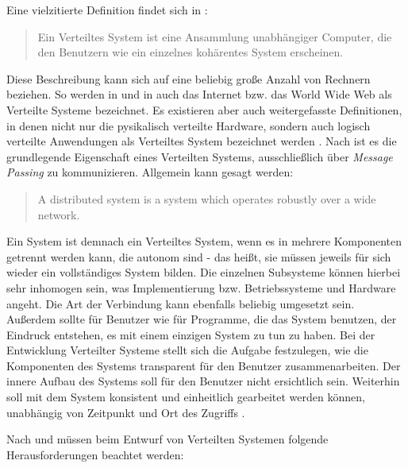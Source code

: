 Eine vielzitierte Definition findet sich in :

\begin{quote}
Ein Verteiltes System ist eine Ansammlung unabhängiger Computer, die den Benutzern wie ein einzelnes kohärentes System erscheinen. 
\end{quote}

Diese Beschreibung kann sich auf eine beliebig große Anzahl von Rechnern beziehen. So werden in  und in  auch das Internet bzw. das World Wide Web als Verteilte Systeme bezeichnet. Es existieren aber auch weitergefasste Definitionen, in denen nicht nur die pysikalisch verteilte Hardware, sondern auch logisch verteilte Anwendungen als Verteiltes System bezeichnet werden . Nach  ist es die grundlegende Eigenschaft eines Verteilten Systems, ausschließlich über \textit{Message Passing} zu kommunizieren. Allgemein kann gesagt werden:

\begin{quote}
A distributed system is a system which operates robustly over a wide network. 
\end{quote}

Ein System ist demnach ein Verteiltes System, wenn es in mehrere Komponenten getrennt werden kann, die autonom sind - das heißt, sie müssen jeweils für sich wieder ein vollständiges System bilden. Die einzelnen Subsysteme können hierbei sehr inhomogen sein, was Implementierung bzw. Betriebssysteme und Hardware angeht. Die Art der Verbindung kann ebenfalls beliebig umgesetzt sein. Außerdem sollte für Benutzer wie für Programme, die das System benutzen, der Eindruck entstehen, es mit einem einzigen System zu tun zu haben. Bei der Entwicklung Verteilter Systeme stellt sich die Aufgabe festzulegen, wie die Komponenten des Systems transparent für den Benutzer zusammenarbeiten. Der innere Aufbau des Systems soll für den Benutzer nicht ersichtlich sein. Weiterhin soll mit dem System konsistent und einheitlich gearbeitet werden können, unabhängig von Zeitpunkt und Ort des Zugriffs .

Nach  und  müssen beim Entwurf von Verteilten Systemen folgende Herausforderungen beachtet werden:

